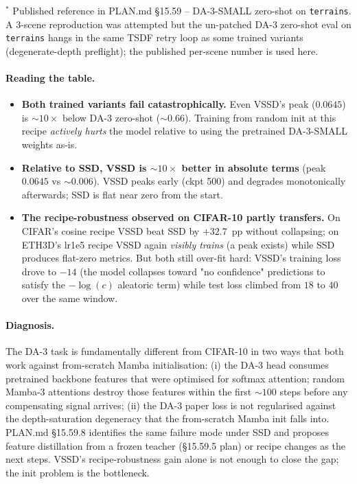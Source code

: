 \documentclass[11pt,a4paper]{article}
\begin{document}
\noindent$^*$ Published reference in PLAN.md \S15.59 -- DA-3-SMALL
zero-shot on \texttt{terrains}. A 3-scene reproduction was attempted
but the un-patched DA-3 zero-shot eval on \texttt{terrains} hangs in
the same TSDF retry loop as some trained variants (degenerate-depth
preflight); the published per-scene number is used here.

\paragraph{Reading the table.}
\begin{itemize}
  \item \textbf{Both trained variants fail catastrophically.} Even
        VSSD's peak ($0.0645$) is $\sim 10\times$ below DA-3 zero-shot
        ($\sim 0.66$). Training from random init at this recipe
        \emph{actively hurts} the model relative to using the
        pretrained DA-3-SMALL weights as-is.
  \item \textbf{Relative to SSD, VSSD is $\sim 10\times$ better in
        absolute terms} (peak $0.0645$ vs $\sim 0.006$). VSSD peaks
        early (ckpt 500) and degrades monotonically afterwards;
        SSD is flat near zero from the start.
  \item \textbf{The recipe-robustness observed on CIFAR-10 partly
        transfers.} On CIFAR's cosine recipe VSSD beat SSD by
        $+32.7$~pp without collapsing; on ETH3D's lr1e5 recipe VSSD
        again \emph{visibly trains} (a peak exists) while SSD
        produces flat-zero metrics. But both still over-fit hard:
        VSSD's training loss drove to $-14$ (the model collapses
        toward "no confidence" predictions to satisfy the
        $-\log(c)$ aleatoric term) while test loss climbed from
        $18$ to $40$ over the same window.
\end{itemize}

\paragraph{Diagnosis.}
The DA-3 task is fundamentally different from CIFAR-10 in two ways
that both work against from-scratch Mamba initialisation: (i) the
DA-3 head consumes pretrained backbone features that were optimised
for softmax attention; random Mamba-3 attentions destroy those
features within the first $\sim 100$ steps before any compensating
signal arrives; (ii) the DA-3 paper loss is not regularised against
the depth-saturation degeneracy that the from-scratch Mamba init
falls into. PLAN.md \S15.59.8 identifies the same failure mode
under SSD and proposes feature distillation from a frozen teacher
(\S15.59.5 plan) or recipe changes as the next steps. VSSD's
recipe-robustness gain alone is not enough to close the gap; the
init problem is the bottleneck.
\end{document}
